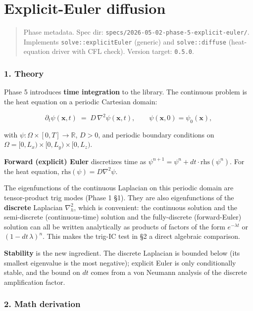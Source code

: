\chapter{Explicit-Euler diffusion}
\label{chap:dev:explicit-euler-diffusion}

\begin{quote}
Phase metadata. Spec dir:
\passthrough{\lstinline!specs/2026-05-02-phase-5-explicit-euler/!}.
Implements \passthrough{\lstinline!solve::explicitEuler!} (generic) and
\passthrough{\lstinline!solve::diffuse!} (heat-equation driver with CFL
check). Version target: \passthrough{\lstinline!0.5.0!}.
\end{quote}

\subsection{1. Theory}\label{theory}

Phase 5 introduces \textbf{time integration} to the library. The
continuous problem is the heat equation on a periodic Cartesian domain:

\[
\partial_t \psi(\mathbf{x}, t) \;=\; D\, \nabla^2 \psi(\mathbf{x}, t),
\qquad \psi(\mathbf{x}, 0) = \psi_0(\mathbf{x}),
\]

with \(\psi : \Omega \times [0, T] \to \mathbb{R}\), \(D > 0\), and
periodic boundary conditions on
\(\Omega = [0, L_x) \times [0, L_y) \times [0, L_z)\).

\textbf{Forward (explicit) Euler} discretizes time as
\(\psi^{n+1} = \psi^n + dt \cdot \mathrm{rhs}(\psi^n)\). For the heat
equation, \(\mathrm{rhs}(\psi) = D \nabla^2 \psi\).

The eigenfunctions of the continuous Laplacian on this periodic domain
are tensor-product trig modes (Phase 1 §1). They are also eigenfunctions
of the \textbf{discrete} Laplacian \(\nabla^2_h\), which is convenient:
the continuous solution and the semi-discrete (continuous-time) solution
and the fully-discrete (forward-Euler) solution can all be written
analytically as products of factors of the form \(e^{-\lambda t}\) or
\((1 - dt\,\lambda)^n\). This makes the trig-IC test in §2 a direct
algebraic comparison.

\textbf{Stability} is the new ingredient. The discrete Laplacian is
bounded below (its smallest eigenvalue is the most negative); explicit
Euler is only conditionally stable, and the bound on \(dt\) comes from a
von Neumann analysis of the discrete amplification factor.

\subsection{2. Math derivation}\label{math-derivation}

